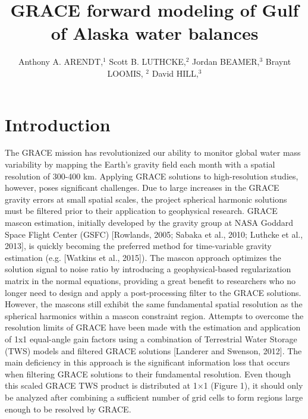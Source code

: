 \documentclass[review]{igs}
\begin{document}
\title[GRACE Forward Modeling]{GRACE forward modeling of Gulf of Alaska water balances}

\author[Arendt and others]{Anthony A. ARENDT,$^1$ Scott B. LUTHCKE,$^2$ Jordan BEAMER,$^3$ Braynt LOOMIS, $^2$ David HILL,$^3$}



\maketitle

\section{Introduction}


\citep{beamer_high-resolution_2016}

The GRACE mission has revolutionized our ability to monitor global water mass variability by mapping the Earth’s gravity field each month with a spatial resolution of 300-400 km. Applying GRACE solutions to high-resolution studies, however, poses significant challenges. Due to large increases in the GRACE gravity errors at small spatial scales, the project spherical harmonic solutions must be filtered prior to their application to geophysical research. GRACE mascon estimation, initially developed by the gravity group at NASA Goddard Space Flight Center (GSFC) [Rowlands, 2005; Sabaka et al., 2010; Luthcke et al., 2013], is quickly becoming the preferred method for time-variable gravity estimation (e.g. [Watkins et al., 2015]). The mascon approach optimizes the solution signal to noise ratio by introducing a geophysical-based regularization matrix in the normal equations, providing a great benefit to researchers who no longer need to design and apply a post-processing filter to the GRACE solutions. However, the mascons still exhibit the same fundamental spatial resolution as the spherical harmonics within a mascon constraint region. Attempts to overcome the resolution limits of GRACE have been made with the estimation and application of 1x1 equal-angle gain factors using a combination of Terrestrial Water Storage (TWS) models and filtered GRACE solutions [Landerer and Swenson, 2012]. The main deficiency in this approach is the significant information loss that occurs when filtering GRACE solutions to their fundamental resolution. Even though this scaled GRACE TWS product is distributed at 1×1 (Figure 1), it should only be analyzed after combining a sufficient number of grid cells to form regions large enough to be resolved by GRACE.
\end{document}
